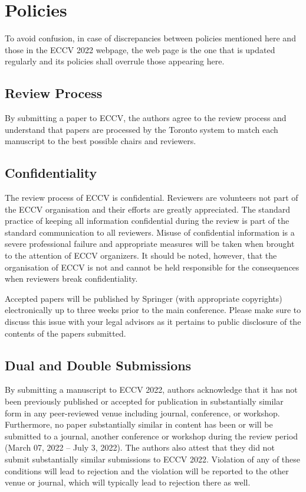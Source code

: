 \documentclass[runningheads]{llncs}
\begin{document}
\section{Policies}
To avoid confusion, in case of discrepancies between policies mentioned here and those in the ECCV 2022 webpage, the web page is the one that is updated regularly and its policies shall overrule those appearing here. 

\subsection{Review Process}
By submitting a paper to ECCV, the authors agree to the review process and understand that papers are processed by the Toronto system to match each manuscript to the best possible chairs and reviewers.
\subsection{Confidentiality}
The review process of ECCV is confidential. Reviewers are volunteers not part of the ECCV organisation and their efforts are greatly appreciated. The standard practice of keeping all information confidential during the review is part of the standard communication to all reviewers. Misuse of confidential information is a severe professional failure and  appropriate measures will be taken when brought to the attention of ECCV organizers. It should be noted, however, that the organisation of ECCV is not and cannot be held responsible for the consequences when reviewers break confidentiality.

Accepted papers will be published by Springer (with appropriate copyrights) electronically up to three weeks prior to the main conference. Please make sure to discuss this issue with your legal advisors as it pertains to public disclosure of the contents of the papers submitted.
\subsection{Dual and Double Submissions}
By submitting a manuscript to ECCV 2022, authors acknowledge that it has not been previously published or accepted for publication in substantially similar form in any peer-reviewed venue including journal, conference, or workshop. Furthermore, no paper substantially similar in content has been or will be submitted to a journal, another conference or workshop during the review period (March 07, 2022 – July 3, 2022). The authors also attest that they did not submit substantially similar submissions to ECCV 2022. Violation of any of these conditions will lead to rejection and the violation will be reported to the other venue or journal, which will typically lead to rejection there as well. 
\end{document}
